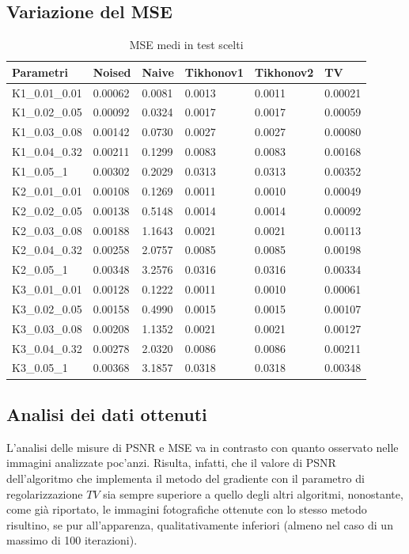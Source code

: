 \documentclass[12pt]{article}
\begin{document}
    \subsection{Variazione del MSE}
    \begin{table}[!ht]
    \centering
    \begin{tabular}{|l|l|l|l|l|l|}
    \hline
        Parametri & Noised & Naive & Tikhonov1 & Tikhonov2 & TV \\ \hline
        K1\_0.01\_0.01 & 0.00062 & 0.0081 & 0.0013 & 0.0011 & 0.00021 \\ \hline
        K1\_0.02\_0.05 & 0.00092 & 0.0324 & 0.0017 & 0.0017 & 0.00059 \\ \hline
        K1\_0.03\_0.08 & 0.00142 & 0.0730 & 0.0027 & 0.0027 & 0.00080 \\ \hline
        K1\_0.04\_0.32 & 0.00211 & 0.1299 & 0.0083 & 0.0083 & 0.00168 \\ \hline
        K1\_0.05\_1    & 0.00302 & 0.2029 & 0.0313 & 0.0313 & 0.00352 \\ \hline
        K2\_0.01\_0.01 & 0.00108 & 0.1269 & 0.0011 & 0.0010 & 0.00049 \\ \hline
        K2\_0.02\_0.05 & 0.00138 & 0.5148 & 0.0014 & 0.0014 & 0.00092 \\ \hline
        K2\_0.03\_0.08 & 0.00188 & 1.1643 & 0.0021 & 0.0021 & 0.00113 \\ \hline
        K2\_0.04\_0.32 & 0.00258 & 2.0757 & 0.0085 & 0.0085 & 0.00198 \\ \hline
        K2\_0.05\_1    & 0.00348 & 3.2576 & 0.0316 & 0.0316 & 0.00334 \\ \hline
        K3\_0.01\_0.01 & 0.00128 & 0.1222 & 0.0011 & 0.0010 & 0.00061 \\ \hline
        K3\_0.02\_0.05 & 0.00158 & 0.4990 & 0.0015 & 0.0015 & 0.00107 \\ \hline
        K3\_0.03\_0.08 & 0.00208 & 1.1352 & 0.0021 & 0.0021 & 0.00127 \\ \hline
        K3\_0.04\_0.32 & 0.00278 & 2.0320 & 0.0086 & 0.0086 & 0.00211 \\ \hline
        K3\_0.05\_1    & 0.00368 & 3.1857 & 0.0318 & 0.0318 & 0.00348 \\ \hline
    \end{tabular}
    \caption{MSE medi in test scelti }
    \label{table:4}
    \end{table}
    
    \subsection{Analisi dei dati ottenuti}
    L'analisi delle misure di PSNR e MSE va in contrasto con quanto osservato nelle immagini analizzate poc'anzi. Risulta, infatti, che il valore di PSNR dell'algoritmo che implementa il metodo del gradiente con il parametro di regolarizzazione $TV$ sia sempre superiore a quello degli altri algoritmi, nonostante, come già riportato, le immagini fotografiche ottenute con lo stesso metodo risultino, se pur all'apparenza, qualitativamente inferiori (almeno nel caso di un massimo di 100 iterazioni).
\end{document}

